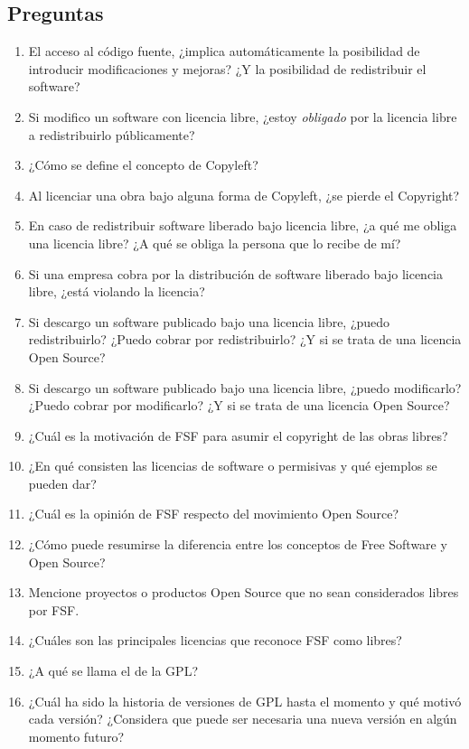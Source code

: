 \subsection{Preguntas}
\begin{enumerate}
	\item El acceso al código fuente, ¿implica automáticamente la posibilidad de introducir modificaciones y mejoras?  ¿Y la posibilidad de redistribuir el software? 
	\item Si modifico un software con licencia libre, ¿estoy \emph{obligado} por la licencia libre a redistribuirlo públicamente? 
	\item ¿Cómo se define el concepto de Copyleft?
	\item Al licenciar una obra bajo alguna forma de Copyleft, ¿se pierde el Copyright?
	\item En caso de redistribuir software liberado bajo licencia libre, ¿a qué me obliga una licencia libre? ¿A qué se obliga la persona que lo recibe de mí?
	\item Si una empresa cobra por la distribución de software liberado bajo licencia libre, ¿está violando la licencia?
	\item Si descargo un software publicado bajo una licencia libre, ¿puedo redistribuirlo? ¿Puedo cobrar por redistribuirlo? ¿Y si se trata de una licencia Open Source?
	\item Si descargo un software publicado bajo una licencia libre, ¿puedo modificarlo? ¿Puedo cobrar por modificarlo? ¿Y si se trata de una licencia Open Source?
	\item ¿Cuál es la motivación de FSF para asumir el copyright de las obras libres?
	\item ¿En qué consisten las licencias de software  o permisivas y qué ejemplos se pueden dar?
	\item ¿Cuál es la opinión de FSF respecto del movimiento Open Source?
	\item ¿Cómo puede resumirse la diferencia entre los conceptos de Free Software y Open Source?
	\item Mencione proyectos o productos Open Source que no sean considerados libres por FSF.
	\item ¿Cuáles son las principales licencias que reconoce FSF como libres?
	\item ¿A qué se llama el  de la GPL?
	\item ¿Cuál ha sido la historia de versiones de GPL hasta el momento y qué motivó cada versión? ¿Considera que puede ser necesaria una nueva versión en algún momento futuro?

\end{enumerate}
